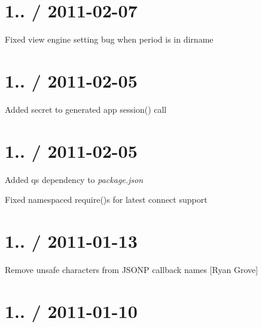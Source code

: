 {\ttfamily \section*{1.. / 2011-\/02-\/07 }}

{\ttfamily }

{\ttfamily 
\begin{DoxyItemize}
\item Fixed {\ttfamily view engine} setting bug when period is in dirname
\end{DoxyItemize}}

{\ttfamily \section*{1.. / 2011-\/02-\/05 }}

{\ttfamily }

{\ttfamily 
\begin{DoxyItemize}
\item Added secret to generated app {\ttfamily session()} call
\end{DoxyItemize}}

{\ttfamily \section*{1.. / 2011-\/02-\/05 }}

{\ttfamily }

{\ttfamily 
\begin{DoxyItemize}
\item Added {\ttfamily qs} dependency to {\itshape package.\+json}
\item Fixed namespaced {\ttfamily require()}s for latest connect support
\end{DoxyItemize}}

{\ttfamily \section*{1.. / 2011-\/01-\/13 }}

{\ttfamily }

{\ttfamily 
\begin{DoxyItemize}
\item Remove unsafe characters from J\+S\+O\+NP callback names \mbox{[}Ryan Grove\mbox{]}
\end{DoxyItemize}}

{\ttfamily \section*{1.. / 2011-\/01-\/10 }}

